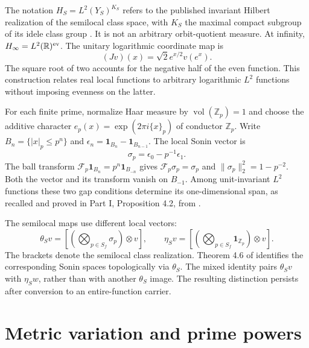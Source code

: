 \documentclass[11pt,letterpaper]{article}
\theoremstyle{definition}
\theoremstyle{remark}
\newcommand{\R}{\mathbb R}
\newcommand{\Z}{\mathbb Z}
\newcommand{\ind}{\mathbf1}
\begin{document}
The notation $H_S=L^2(Y_S)^{K_S}$ refers to the published invariant
Hilbert realization of the semilocal class space, with $K_S$ the
maximal compact subgroup of its idele class group
\cite[Section 4.1]{CCM}. It is not an arbitrary orbit-quotient measure.
At infinity, $H_\infty=L^2(\R)^{\rm ev}$. The unitary logarithmic
coordinate map is
\begin{equation}
 (Jv)(x)=\sqrt2e^{x/2}v(e^x).
 \label{eq:log-coordinate}
\end{equation}
The square root of two accounts for the negative half of the even
function. This construction relates real local functions to arbitrary
logarithmic $L^2$ functions without imposing evenness on the latter.

For each finite prime, normalize Haar measure by
$\operatorname{vol}(\Z_p)=1$ and choose the additive character
$e_p(x)=\exp(2\pi i\{x\}_p)$ of conductor $\Z_p$. Write
$B_n=\{|x|_p\le p^n\}$ and $\epsilon_n=\ind_{B_n}-\ind_{B_{n-1}}$.
The local Sonin vector is
\begin{equation}
 \sigma_p=\epsilon_0-p^{-1}\epsilon_1.
 \label{eq:shell}
\end{equation}
The ball transform $\mathscr F_p\ind_{B_n}=p^n\ind_{B_{-n}}$
gives $\mathscr F_p\sigma_p=\sigma_p$ and
$\|\sigma_p\|_2^2=1-p^{-2}$. Both the vector and its transform
vanish on $B_{-1}$. Among unit-invariant $L^2$ functions these two
gap conditions determine its one-dimensional span, as recalled and
proved in Part I, Proposition 4.2, from \cite[Section 4.5]{CCM}.

The semilocal maps use different local vectors:
\begin{equation}
 \theta_Sv=[(\bigotimes_{p\in S_f}\sigma_p)\otimes v],\qquad
 \eta_Sv=[(\bigotimes_{p\in S_f}\ind_{\Z_p})\otimes v].
 \label{eq:theta-eta}
\end{equation}
The brackets denote the semilocal class realization. Theorem 4.6
of \cite{CCM} identifies the corresponding Sonin spaces
topologically via $\theta_S$. The mixed identity pairs
$\theta_Sv$ with $\eta_Sw$, rather than with another $\theta_S$
image. The resulting distinction persists after conversion to an
entire-function carrier.

\section{Metric variation and prime powers}
\end{document}
